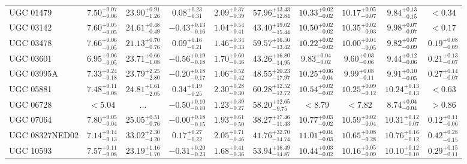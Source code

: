 \documentclass[onecolumn]{mn2e}
\begin{document}
\begin{landscape}
{\begin{center}
\begin{longtable}{lccccccccc}
UGC 01479 & $7.50_{-0.06}^{+0.07}$ & $23.90_{-1.26}^{+0.91}$ & $0.08_{-0.31}^{+0.23}$ & $2.09_{-0.39}^{+0.37}$ &$57.96_{-12.84}^{+13.43}$ & $10.33_{-0.02}^{+0.02}$ & $10.17_{-0.07}^{+0.05}$ & $9.84_{-0.15}^{+0.13}$ & $<0.34$ \\
UGC 03142 & $7.60_{-0.05}^{+0.05}$ & $24.61_{-0.49}^{+0.48}$ & $-0.43_{-0.16}^{+0.13}$ & $1.04_{-0.41}^{+0.54}$ &$43.40_{-15.44}^{+19.02}$ & $10.50_{-0.02}^{+0.02}$ & $10.35_{-0.03}^{+0.02}$ & $9.98_{-0.07}^{+0.07}$ & $<0.17$ \\
UGC 03478 & $7.66_{-0.05}^{+0.06}$ & $21.13_{-0.76}^{+0.70}$ & $0.09_{-0.21}^{+0.16}$ & $1.46_{-0.33}^{+0.34}$ &$59.57_{-13.42}^{+16.50}$ & $10.22_{-0.02}^{+0.02}$ & $10.00_{-0.05}^{+0.04}$ & $9.82_{-0.09}^{+0.07}$ & $0.19_{-0.09}^{+0.08}$ \\
UGC 03601 & $6.95_{-0.05}^{+0.06}$ & $23.71_{-1.08}^{+0.66}$ & $-0.56_{-0.18}^{+0.19}$ & $1.70_{-0.46}^{+0.60}$ &$43.26_{-14.95}^{+16.80}$ & $9.83_{-0.02}^{+0.04}$ & $9.60_{-0.06}^{+0.03}$ & $9.44_{-0.06}^{+0.12}$ & $0.21_{-0.07}^{+0.13}$ \\
UGC 03995A & $7.33_{-0.18}^{+0.24}$ & $23.79_{-2.80}^{+2.25}$ & $-0.20_{-0.17}^{+0.18}$ & $1.06_{-0.42}^{+0.52}$ &$48.55_{-17.97}^{+20.23}$ & $10.25_{-0.04}^{+0.06}$ & $9.99_{-0.11}^{+0.08}$ & $9.91_{-0.05}^{+0.10}$ & $0.27_{-0.07}^{+0.14}$ \\
UGC 05881 & $7.48_{-0.08}^{+0.11}$ & $24.81_{-2.05}^{+1.61}$ & $0.34_{-0.25}^{+0.19}$ & $2.30_{-0.30}^{+0.28}$ &$60.28_{-12.72}^{+12.52}$ & $10.54_{-0.02}^{+0.02}$ & $10.25_{-0.12}^{+0.09}$ & $10.24_{-0.13}^{+0.13}$ & $<0.63$ \\
UGC 06728 & $<5.04$ & ... & $-0.50_{-0.10}^{+0.10}$ & $1.23_{-0.27}^{+0.39}$ &$58.20_{-9.75}^{+12.65}$ & $<8.79$ & $<7.82$ & $8.74_{-0.04}^{+0.04}$ & $>0.86$ \\
UGC 07064 & $7.80_{-0.04}^{+0.05}$ & $25.05_{-0.76}^{+0.51}$ & $-0.00_{-0.15}^{+0.18}$ & $1.93_{-0.50}^{+0.61}$ &$38.27_{-11.43}^{+17.46}$ & $10.77_{-0.02}^{+0.03}$ & $10.59_{-0.04}^{+0.02}$ & $10.31_{-0.07}^{+0.12}$ & $0.12_{-0.06}^{+0.11}$ \\
UGC 08327NED02 & $7.14_{-0.13}^{+0.14}$ & $33.02_{-4.20}^{+2.30}$ & $0.17_{-0.22}^{+0.27}$ & $2.05_{-0.46}^{+0.71}$ &$41.76_{-14.74}^{+32.70}$ & $11.01_{-0.03}^{+0.04}$ & $10.65_{-0.28}^{+0.08}$ & $10.76_{-0.12}^{+0.16}$ & $0.42_{-0.15}^{+0.28}$ \\
UGC 10593 & $7.57_{-0.08}^{+0.11}$ & $23.19_{-1.70}^{+1.16}$ & $-0.31_{-0.23}^{+0.20}$ & $1.68_{-0.36}^{+0.41}$ &$53.94_{-14.87}^{+16.49}$ & $10.44_{-0.02}^{+0.03}$ & $10.16_{-0.09}^{+0.05}$ & $10.10_{-0.10}^{+0.12}$ & $0.29_{-0.11}^{+0.15}$ \\

\end{longtable}
\end{center}}
\end{landscape}
\end{document}
